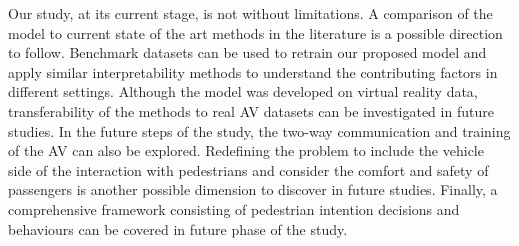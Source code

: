 Our study, at its current stage, is not without limitations. A comparison of the model to current state of the art methods in the literature is a possible direction to follow. Benchmark datasets can be used to retrain our proposed model and apply similar interpretability methods to understand the contributing factors in different settings. Although the model was developed on virtual reality data, transferability of the methods to real AV datasets can be investigated in future studies. In the future steps of the study, the two-way communication and training of the AV can also be explored. Redefining the problem to include the vehicle side of the interaction with pedestrians and consider the comfort and safety of passengers is another possible dimension to discover in future studies.  Finally, a comprehensive framework consisting of pedestrian intention decisions and behaviours can be covered in future phase of the study.